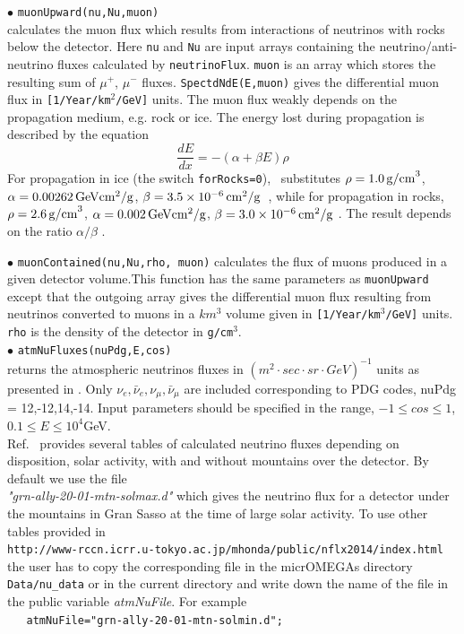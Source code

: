 \documentclass[12pt,a4paper]{article}
\begin{document}
\noindent
$\bullet$ \verb|muonUpward(nu,Nu,muon)|\\
calculates the muon flux which results from interactions of
neutrinos with rocks below the detector. Here  {\tt nu} and {\tt Nu} are input arrays containing the
neutrino/anti-neutrino fluxes calculated by {\tt neutrinoFlux}. {\tt muon} is an
array which stores the resulting sum of $\mu^+$, $\mu^-$ fluxes. {\tt SpectdNdE(E,muon)}  gives the
differential muon flux  in \verb|[1/Year/km|$^2$\verb|/GeV]| units.  
The muon flux weakly depends on the propagation medium, e.g. rock or ice. The energy lost during
propagation is described by  the equation  \cite{Erkoca:2009by}
\begin{equation}
\frac{dE}{dx}=-(\alpha +\beta E)\rho 
\end{equation}
For propagation in ice (the switch {\tt forRocks=0}),
 \micro\ substitutes 
$\rho= 1.0{\rm \, g/cm}^3$, $\alpha=0.00262 {\rm \, GeV} {\rm cm}^2/{\rm g}$,  $\beta=3.5\times 10^{-6} {\rm \, cm}^2/{\rm g}$~\cite{Chirkin:2004hz}, while
for propagation in rocks, 
$\rho= 2.6{\rm \, g/cm}^3$, $\alpha=0.002 {\rm \, GeV} {\rm cm}^2/{\rm g}$,  $\beta=3.0\times 10^{-6} {\rm \, cm}^2/{\rm g}$ \cite{Erkoca:2009by}. 
The result depends on the ratio $\alpha/\beta$ .

\noindent $\bullet$ \verb|muonContained(nu,Nu,rho, muon)|
calculates  the flux  of muons  produced in a given detector volume.This function  has the same parameters as \verb|muonUpward| 
except that the  outgoing  array gives the differential muon flux resulting from neutrinos converted to muons 
in a  $km^3$ volume given  in \verb|[1/Year/km|$^3$\verb|/GeV]| units.  \verb|rho| is the density of the detector in 
\verb|g/cm|$^3$.\\

\noindent $\bullet$ \verb|atmNuFluxes(nuPdg,E,cos)| \\
returns the atmospheric  neutrinos fluxes in $( m^2\cdot sec\cdot sr\cdot GeV)^{-1}$ units  as presented in \cite{Honda:2015fha}. 
Only $\nu_e,\bar\nu_e,\nu_\mu,\bar\nu_\mu$ are included corresponding to PDG codes,  nuPdg =  12,-12,14,-14. Input parameters should be specified in the range,
$-1\le cos\le 1$,  $ 0.1 \le E \le 10^4$GeV.\\
Ref.~\cite{Honda:2015fha} provides  several tables of calculated neutrino fluxes depending on disposition, 
solar activity, with and without  mountains over the detector. By default we use the  file\\
 {\it "grn-ally-20-01-mtn-solmax.d"} which gives the neutrino flux for a detector 
under  the mountains in Gran Sasso at the time of large solar activity. To use other tables provided  in\\
 {\tt http://www-rccn.icrr.u-tokyo.ac.jp/mhonda/public/nflx2014/index.html} \\
the user has to copy the corresponding file in the micrOMEGAs directory {\tt Data/nu\_data} or in the  current directory and  write down the name of the file in  the public variable {\it atmNuFile}. For example\\
\verb|   atmNuFile="grn-ally-20-01-mtn-solmin.d";|\\
\end{document}
